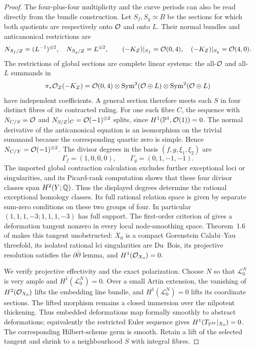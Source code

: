 \begin{proof}
The four-plus-four multiplicity and the curve periods can also be read
directly from the bundle construction. Let $S_f,S_g\simeq B$ be the
sections for which both quotients are respectively onto $\mathcal O$ and onto
$L$. Their normal bundles and anticanonical restrictions are
\[
 N_{S_f/Z}=(L^{-1})^{\oplus2},\quad N_{S_g/Z}=L^{\oplus2},\qquad
 (-K_Z)|_{S_f}=\mathcal O(0,4),\quad (-K_Z)|_{S_g}=\mathcal O(4,0).
\]
The restrictions of global sections are complete linear systems: the
all-$\mathcal O$ and all-$L$ summands in
\[
 \pi_*\mathcal O_Z(-K_Z)=\mathcal O(0,4)\otimes\operatorname{Sym}^2(\mathcal O\oplus L)
                              \otimes\operatorname{Sym}^2(\mathcal O\oplus L)
\]
have independent coefficients. A general section therefore meets each
$S$ in four distinct fibres of its contracted ruling. For one such fibre
$C$, the sequence with $N_{C/S}=\mathcal O$ and $N_{S/Z}|_C=\mathcal O(-1)^{\oplus2}$
splits, since $H^1(\mathbb P^1,\mathcal O(1))=0$. The normal derivative of the
anticanonical equation is an isomorphism on the trivial summand because
the corresponding quartic zero is simple. Hence
$N_{C/Y}=\mathcal O(-1)^{\oplus2}$. The divisor degrees in the basis
$(f,g,\xi_1,\xi_2)$ are
\begin{equation}\label{eq:eight-period-types}
 \Gamma_f=(1,0,0,0),\qquad \Gamma_g=(0,1,-1,-1).
\end{equation}
The imported global contraction calculation excludes further exceptional
loci or singularities, and its Picard-rank computation shows that these
four divisor classes span $H^2(Y;\mathbb Q)$. Thus the displayed degrees
determine the rational exceptional homology classes.
Its full rational relation space is given by separate sum-zero
conditions on these two groups of four. In particular
$(1,1,1,-3;1,1,1,-3)$ has full support.
The first-order criterion of
\cite[Theorem~1.2 and Section~3, (3.2)]{rollenske-thomas} gives a
deformation tangent nonzero in every local node-smoothing space.
Theorem~1.6 of \cite{friedman-unobstructed} makes this tangent
unobstructed: $X_0$ is a compact Gorenstein Calabi--Yau threefold,
its isolated rational lci singularities are Du~Bois, its projective
resolution satisfies the $\partial\bar\partial$ lemma, and
$H^1(\mathcal O_{X_0})=0$.

We verify projective effectivity and the exact polarization.
Choose $N$ so that $\mathcal L_0^N$ is very ample and
$H^1(\mathcal L_0^N)=0$. Over a small Artin extension, the
vanishing of $H^2(\mathcal O_{X_0})$ lifts the embedding line bundle,
and $H^1(\mathcal L_0^N)=0$ lifts its coordinate sections.
The lifted morphism remains a closed immersion over the nilpotent
thickening. Thus embedded deformations map formally smoothly to
abstract deformations; equivalently the restricted Euler sequence
gives $H^1(T_{\mathbb P^M}|_{X_0})=0$.
The corresponding Hilbert-scheme germ is smooth. Retain a lift of the
selected tangent and shrink to a neighbourhood $S$ with integral fibres.


\end{proof}

